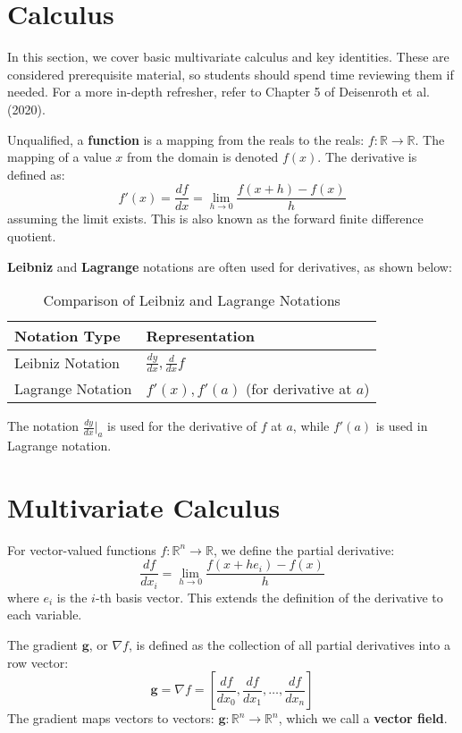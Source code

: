 \section{Calculus}

In this section, we cover basic multivariate calculus and key identities. These are considered prerequisite material, so students should spend time reviewing them if needed. For a more in-depth refresher, refer to Chapter 5 of Deisenroth et al. (2020).

Unqualified, a \textbf{function} is a mapping from the reals to the reals: $f : \mathbb{R} \to \mathbb{R}$. The mapping of a value $x$ from the domain is denoted $f(x)$. The derivative is defined as:
\[
f'(x) = \frac{df}{dx} = \lim_{h \to 0} \frac{f(x+h) - f(x)}{h}
\]
assuming the limit exists. This is also known as the forward finite difference quotient.

\textbf{Leibniz} and \textbf{Lagrange} notations are often used for derivatives, as shown below:

\begin{table}[h]
    \centering
    \begin{tabularx}{\textwidth}{@{}lX@{}}
        \toprule
        \textbf{Notation Type} & \textbf{Representation} \\ \midrule
        Leibniz Notation & $\frac{dy}{dx}, \frac{d}{dx} f$ \\
        Lagrange Notation & $f'(x), f'(a)$ (for derivative at $a$) \\ \bottomrule
    \end{tabularx}
    \caption{Comparison of Leibniz and Lagrange Notations}
\end{table}

The notation $\frac{dy}{dx}\big|_{a}$ is used for the derivative of $f$ at $a$, while $f'(a)$ is used in Lagrange notation.

\section{Multivariate Calculus}

For vector-valued functions $f : \mathbb{R}^n \to \mathbb{R}$, we define the partial derivative:
\[
\frac{df}{dx_i} = \lim_{h \to 0} \frac{f(x + h e_i) - f(x)}{h}
\]
where $e_i$ is the $i$-th basis vector. This extends the definition of the derivative to each variable.

The gradient $\mathbf{g}$, or $\nabla f$, is defined as the collection of all partial derivatives into a row vector:
\[
\mathbf{g} = \nabla f = \left[ \frac{df}{dx_0}, \frac{df}{dx_1}, \dots, \frac{df}{dx_n} \right]
\]
The gradient maps vectors to vectors: $\mathbf{g} : \mathbb{R}^n \to \mathbb{R}^n$, which we call a \textbf{vector field}.

